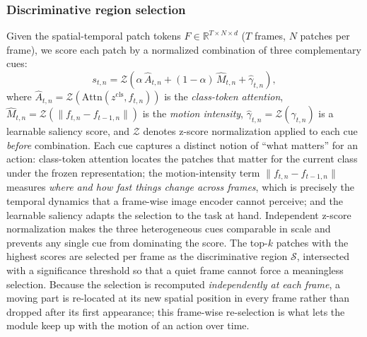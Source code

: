 \subsubsection{Discriminative region selection}
Given the spatial-temporal patch tokens $F \in \mathbb{R}^{T \times N \times d}$ ($T$ frames, $N$ patches per frame), we score each patch by a normalized combination of three complementary cues:
\begin{equation}
  s_{t,n} = \mathcal{Z}\!\left(
    \alpha \, \hat{A}_{t,n} + (1 - \alpha) \, \hat{M}_{t,n} + \hat{\gamma}_{t,n} \right),
  \label{eq:sata-score}
\end{equation}
where $\hat{A}_{t,n} = \mathcal{Z}(\mathrm{Attn}(z^{\text{cls}}, f_{t,n}))$ is the \emph{class-token attention}, $\hat{M}_{t,n} = \mathcal{Z}(\lVert f_{t,n} - f_{t-1,n} \rVert)$ is the \emph{motion intensity}, $\hat{\gamma}_{t,n} = \mathcal{Z}(\gamma_{t,n})$ is a learnable saliency score, and $\mathcal{Z}$ denotes z-score normalization applied to each cue \emph{before} combination.
Each cue captures a distinct notion of ``what matters'' for an action: class-token attention locates the patches that matter for the current class under the frozen representation; the motion-intensity term $\lVert f_{t,n} - f_{t-1,n} \rVert$ measures \emph{where and how fast things change across frames}, which is precisely the temporal dynamics that a frame-wise image encoder cannot perceive; and the learnable saliency adapts the selection to the task at hand. Independent z-score normalization makes the three heterogeneous cues comparable in scale and prevents any single cue from dominating the score.
The top-$k$ patches with the highest scores are selected per frame as the discriminative region $\mathcal{S}$, intersected with a significance threshold so that a quiet frame cannot force a meaningless selection. Because the selection is recomputed \emph{independently at each frame}, a moving part is re-located at its new spatial position in every frame rather than dropped after its first appearance; this frame-wise re-selection is what lets the module keep up with the motion of an action over time.

